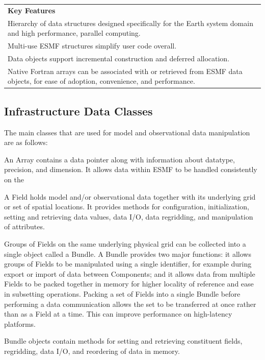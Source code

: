 \begin{center}  
\begin{tabular}{|p{6in}|}
\hline
\vspace{.01in}
{\bf Key Features} \\[.01in]
Hierarchy of data structures designed specifically for the Earth system domain 
and high performance, parallel computing. \\
Multi-use ESMF structures simplify user code overall. \\
Data objects support incremental construction and deferred allocation. \\ 
Native Fortran arrays can be associated with or retrieved from ESMF data
objects, for ease of adoption, convenience, and performance. \\[.03in] \hline
\end{tabular}
\end{center}

\subsection{Infrastructure Data Classes}

The main classes that are used for model and observational data manipulation
are as follows:

An Array contains a data pointer along with information
about datatype, precision, and dimension.  It allows data within 
ESMF to be handled consistently on the 

A Field holds model and/or observational 
data together with its underlying grid or set of spatial locations.  
It provides methods for configuration, initialization, setting and
retrieving data values, data I/O, data regridding, and 
manipulation of attributes.

Groups of Fields on the same underlying physical grid 
can be collected into a single object called a Bundle.  
A Bundle provides two major functions: it allows groups of 
Fields to be manipulated using a single identifier, for example 
during export or import of data between Components; and 
it allows data from multiple Fields to be packed together 
in memory for higher locality of reference and ease in 
subsetting operations.  Packing a set of Fields into a single
Bundle before performing a data communication allows the set 
to be transferred at once rather than as a Field at a time.
This can improve performance on high-latency platforms.

Bundle objects contain methods for setting and retrieving constituent 
fields, regridding, data I/O, and reordering of data in memory.

